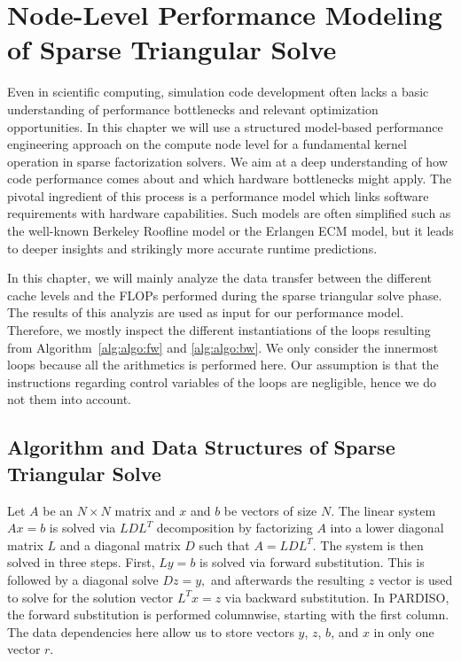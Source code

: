 \chapter{Node-Level Performance Modeling of Sparse Triangular Solve}

Even in scientific computing, simulation code development often lacks a basic understanding of performance bottlenecks and relevant optimization opportunities. In this chapter we will use a structured model-based performance engineering approach on the compute node level for a fundamental kernel operation in sparse factorization solvers. We aim at a deep understanding of how code performance comes about and which hardware bottlenecks might apply. The pivotal ingredient of this process is a performance model which links software requirements with hardware capabilities. Such models are often simplified such as the well-known Berkeley Roofline model or the Erlangen ECM model, but it leads to deeper insights and strikingly more accurate runtime predictions.

In this chapter, we will mainly analyze the data transfer between the different cache levels and the FLOPs performed during the sparse triangular solve phase. The results of this analyzis are used as input for our performance model. Therefore, we mostly inspect the different instantiations of the loops resulting from Algorithm~\ref{alg:algo:fw} and \ref{alg:algo:bw}. We only consider the innermost loops because all the arithmetics is performed here. Our assumption is that the instructions regarding control variables of the loops are negligible, hence we do not them into account.

\section{Algorithm and Data Structures of Sparse Triangular Solve}

\label{sec:algo}

Let $A$ be an $N \times N$ matrix and $x$ and $b$ be vectors of size $N$.
The linear system $A x = b$ is solved via $LDL^T$ decomposition by factorizing $A$
into a lower diagonal matrix $L$ and a diagonal matrix $D$ 
such
that $A =
LDL^T$.
The system is then solved in three steps. First,
$
  \label{eq:fw}
  Ly=b
$
is solved via forward substitution. This is followed by a diagonal solve
$
  \label{eq:dg}
  Dz=y,
$
and afterwards the resulting $z$ vector is used to solve for the solution vector 
%
$
  \label{eq:bw}
  L^Tx=z
$
% 
via backward substitution. In 
PARDISO, 
the forward substitution is performed columnwise, starting with the
first column.
The data dependencies here allow us to store vectors $y$, $z$, $b$, and $x$ in
only one vector $r$. 


